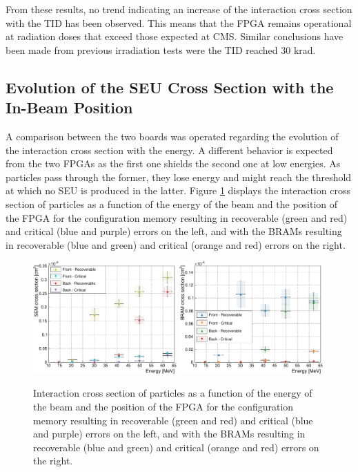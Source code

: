       From these results, no trend indicating an increase of the interaction cross section with the TID has been observed. This means that the FPGA remains operational at radiation doses that exceed those expected at CMS. Similar conclusions have been made from previous irradiation tests \cite{Bylsma2013242} were the TID reached 30 krad.

    \subsection{Evolution of the SEU Cross Section with the In-Beam Position}

      A comparison between the two boards was operated regarding the evolution of the interaction cross section with the energy. A different behavior is expected from the two FPGAs as the first one shields the second one at low energies. As particles pass through the former, they lose energy and might reach the threshold at which no SEU is produced in the latter. Figure \ref{fig:II-5-data-seu-comp} displays the interaction cross section of particles as a function of the energy of the beam and the position of the FPGA for the configuration memory resulting in recoverable (green and red) and critical (blue and purple) errors on the left, and with the BRAMs resulting in recoverable (blue and green) and critical (orange and red) errors on the right. \\

      \begin{figure}[t!]
        \centering
        \includegraphics[width=0.49\textwidth]{img/plots/cE_SEU_Comp-crop}
        \includegraphics[width=0.49\textwidth]{img/plots/cE_BRAM_Comp-crop}
        \caption{Interaction cross section of particles as a function of the energy of the beam and the position of the FPGA for the configuration memory resulting in recoverable (green and red) and critical (blue and purple) errors on the left, and with the BRAMs resulting in recoverable (blue and green) and critical (orange and red) errors on the right.}
        \label{fig:II-5-data-seu-comp}
      \end{figure}

